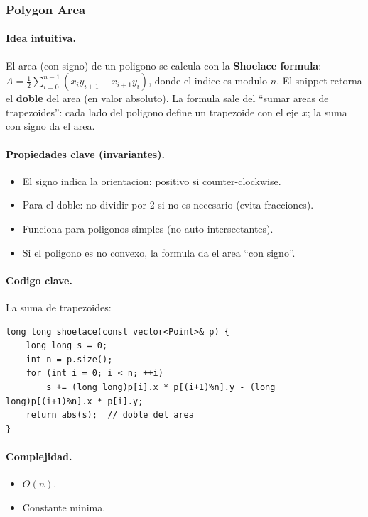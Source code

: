 ﻿\subsubsection{Polygon Area}

\paragraph{Idea intuitiva.}
El area (con signo) de un poligono se calcula con la \textbf{Shoelace formula}: $A = \frac{1}{2} \sum_{i=0}^{n-1} (x_i y_{i+1} - x_{i+1} y_i)$, donde el indice es modulo $n$. El snippet retorna el \textbf{doble} del area (en valor absoluto). La formula sale del ``sumar areas de trapezoides'': cada lado del poligono define un trapezoide con el eje $x$; la suma con signo da el area.

\paragraph{Propiedades clave (invariantes).}
\begin{itemize}\setlength\itemsep{0pt}
	\item El signo indica la orientacion: positivo si counter-clockwise.
	\item Para el doble: no dividir por 2 si no es necesario (evita fracciones).
	\item Funciona para poligonos simples (no auto-intersectantes).
	\item Si el poligono es no convexo, la formula da el area ``con signo''.
\end{itemize}

\paragraph{Codigo clave.}
La suma de trapezoides:
\begin{verbatim}
long long shoelace(const vector<Point>& p) {
    long long s = 0;
    int n = p.size();
    for (int i = 0; i < n; ++i)
        s += (long long)p[i].x * p[(i+1)%n].y - (long long)p[(i+1)%n].x * p[i].y;
    return abs(s);  // doble del area
}
\end{verbatim}

\paragraph{Complejidad.}
\begin{itemize}\setlength\itemsep{0pt}
	\item $O(n)$.
	\item Constante minima.
\end{itemize}

